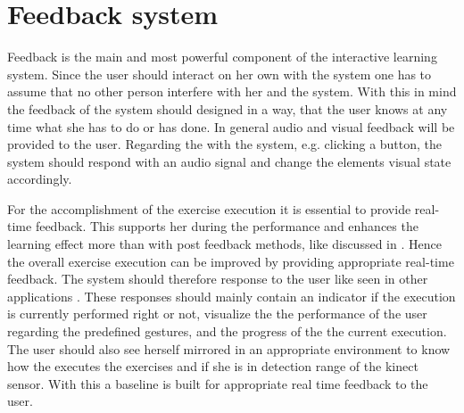 \section{Feedback system}\label{4_5_feedbackSystem}



Feedback is the main and most powerful component of the interactive learning system. Since the user should interact on her own with the system one has to assume that no other person interfere with her and the system. With this in mind the feedback of the system should designed in a way, that the user knows at any time what she has to do or has done. In general audio and visual feedback will be provided to the user. Regarding the \textbf{} with the system, e.g. clicking a button, the system should respond with an audio signal and change the elements visual state accordingly.

For the accomplishment of the exercise execution it is essential to provide real-time feedback. This supports her during the performance and enhances the learning effect more than with post feedback methods, like discussed in \textbf{}. Hence the overall exercise execution can be improved by providing appropriate real-time feedback. The system should therefore response to the user like seen in other applications \textbf{}. These responses should mainly contain an indicator if the execution is currently performed right or not, visualize the the performance of the user regarding the predefined gestures, and the progress of the the current execution. The user should also see herself mirrored in an appropriate environment to know how the executes the exercises and if she is in detection range of the kinect sensor. With this a baseline is built for appropriate real time feedback to the user.

